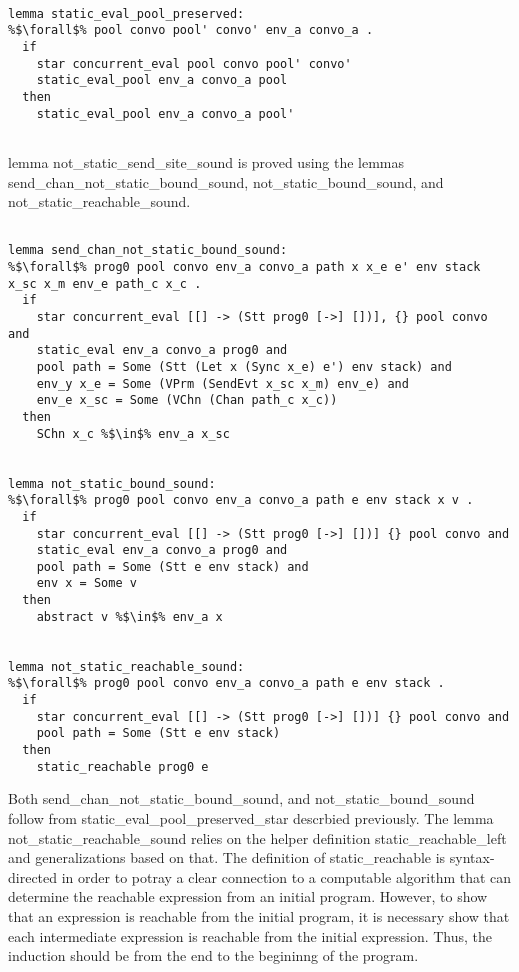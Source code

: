 \documentclass{article}
\begin{document}
\begin{lstlisting}[language=logic, style=codestyle1, escapechar=\%]

lemma static_eval_pool_preserved:
%$\forall$% pool convo pool' convo' env_a convo_a .
  if
    star concurrent_eval pool convo pool' convo' 
    static_eval_pool env_a convo_a pool
  then
    static_eval_pool env_a convo_a pool'


\end{lstlisting}

lemma not\_static\_send\_site\_sound is proved using the lemmas   
send\_chan\_not\_static\_bound\_sound, not\_static\_bound\_sound, and
not\_static\_reachable\_sound.

\begin{lstlisting}[language=logic, style=codestyle1, escapechar=\%]

lemma send_chan_not_static_bound_sound:
%$\forall$% prog0 pool convo env_a convo_a path x x_e e' env stack x_sc x_m env_e path_c x_c .
  if
    star concurrent_eval [[] -> (Stt prog0 [->] [])], {} pool convo and
    static_eval env_a convo_a prog0 and
    pool path = Some (Stt (Let x (Sync x_e) e') env stack) and
    env_y x_e = Some (VPrm (SendEvt x_sc x_m) env_e) and
    env_e x_sc = Some (VChn (Chan path_c x_c))
  then
    SChn x_c %$\in$% env_a x_sc


lemma not_static_bound_sound:
%$\forall$% prog0 pool convo env_a convo_a path e env stack x v .
  if
    star concurrent_eval [[] -> (Stt prog0 [->] [])] {} pool convo and
    static_eval env_a convo_a prog0 and 
    pool path = Some (Stt e env stack) and 
    env x = Some v
  then
    abstract v %$\in$% env_a x


lemma not_static_reachable_sound:
%$\forall$% prog0 pool convo env_a convo_a path e env stack .
  if
    star concurrent_eval [[] -> (Stt prog0 [->] [])] {} pool convo and
    pool path = Some (Stt e env stack)
  then
    static_reachable prog0 e

\end{lstlisting}


Both send\_chan\_not\_static\_bound\_sound, and not\_static\_bound\_sound follow from
static\_eval\_pool\_preserved\_star descrbied previously.
The lemma not\_static\_reachable\_sound relies on the helper definition static\_reachable\_left
and generalizations based on that.
The definition of static\_reachable is syntax-directed in order to potray a clear connection to
a computable algorithm that can determine the reachable expression from an initial program.
However, to show that an expression is reachable from the initial program, it is necessary
show that each intermediate expression is reachable from the initial expression.  Thus, the
induction should be from the end to the begininng of the program.
\end{document}
